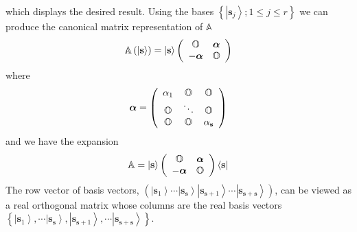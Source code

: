 \documentclass[aps,preprint]{revtex4}%
\begin{document}
which displays the desired result. Using the bases $\left\{  \left\vert
\mathbf{s}_{j}\right\rangle ;1\leq j\leq r\right\}  $ we can produce the
canonical matrix representation of $\mathbb{A}$
\begin{equation}
\mathbb{A}\left(  \left\vert \mathbf{s}\right\rangle \right)  =\left\vert
\mathbf{s}\right\rangle \left(
\begin{array}
[c]{cc}%
\mathbb{O} & \boldsymbol{\alpha}\\
-\boldsymbol{\alpha} & \mathbb{O}%
\end{array}
\right)
\end{equation}
where
\begin{equation}
\boldsymbol{\alpha}=\left(
\begin{array}
[c]{ccc}%
\alpha_{1} & \mathbb{O} & \mathbb{O}\\
\mathbb{O} & \ddots & \mathbb{O}\\
\mathbb{O} & \mathbb{O} & \alpha_{\mathbf{s}}%
\end{array}
\right)
\end{equation}
and we have the expansion
\begin{equation}
\mathbb{A}=\left\vert \mathbf{s}\right\rangle \left(
\begin{array}
[c]{cc}%
\mathbb{O} & \boldsymbol{\alpha}\\
-\boldsymbol{\alpha} & \mathbb{O}%
\end{array}
\right)  \left\langle \mathbf{s}\right\vert \label{reex}%
\end{equation}
The row vector of basis vectors, $\left(  \left\vert \mathbf{s}_{1}%
\right\rangle \cdots\left\vert \mathbf{s}_{\mathbf{s}}\right\rangle \left\vert
\mathbf{s}_{\mathbf{s}+1}\right\rangle \cdots\left\vert \mathbf{s}%
_{\mathbf{s}+\mathbf{s}}\right\rangle \right)  $, can be viewed as a real
orthogonal matrix whose columns are the real basis vectors $\left\{
\left\vert \mathbf{s}_{1}\right\rangle ,\cdots\left\vert \mathbf{s}%
_{\mathbf{s}}\right\rangle ,\left\vert \mathbf{s}_{\mathbf{s}+1}\right\rangle
,\cdots\left\vert \mathbf{s}_{\mathbf{s}+\mathbf{s}}\right\rangle \right\}  $.
\end{document}
